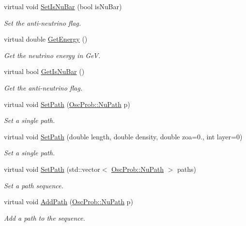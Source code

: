 \begin{DoxyCompactItemize}
virtual void \hyperlink{classOscProb_1_1PMNS__Base_a717e0348cf762f3961854e332a9b52e0}{Set\+Is\+Nu\+Bar} (bool is\+Nu\+Bar)
\begin{DoxyCompactList}\small\item\em Set the anti-\/neutrino flag. \end{DoxyCompactList}\item 
virtual double \hyperlink{classOscProb_1_1PMNS__Base_acc0d46cc4b8f911b40b807225003bbed}{Get\+Energy} ()
\begin{DoxyCompactList}\small\item\em Get the neutrino energy in GeV. \end{DoxyCompactList}\item 
virtual bool \hyperlink{classOscProb_1_1PMNS__Base_a2f7f2a028dfe7a90fff6b4f757972c2c}{Get\+Is\+Nu\+Bar} ()
\begin{DoxyCompactList}\small\item\em Get the anti-\/neutrino flag. \end{DoxyCompactList}\item 
virtual void \hyperlink{classOscProb_1_1PMNS__Base_ac3b644fd0a56347d304ceca4ae9d8875}{Set\+Path} (\hyperlink{structOscProb_1_1NuPath}{Osc\+Prob\+::\+Nu\+Path} p)
\begin{DoxyCompactList}\small\item\em Set a single path. \end{DoxyCompactList}\item 
virtual void \hyperlink{classOscProb_1_1PMNS__Base_a35b983270613072a3df58b574d80dbfd}{Set\+Path} (double length, double density, double zoa=0., int layer=0)
\begin{DoxyCompactList}\small\item\em Set a single path. \end{DoxyCompactList}\item 
virtual void \hyperlink{classOscProb_1_1PMNS__Base_a637d19dd850b4246507796526622643c}{Set\+Path} (std\+::vector$<$ \hyperlink{structOscProb_1_1NuPath}{Osc\+Prob\+::\+Nu\+Path} $>$ paths)
\begin{DoxyCompactList}\small\item\em Set a path sequence. \end{DoxyCompactList}\item 
virtual void \hyperlink{classOscProb_1_1PMNS__Base_a887dc9d4dc569ec0cdef3933b4c60efc}{Add\+Path} (\hyperlink{structOscProb_1_1NuPath}{Osc\+Prob\+::\+Nu\+Path} p)
\begin{DoxyCompactList}\small\item\em Add a path to the sequence. \end{DoxyCompactList}\item 

\end{DoxyCompactItemize}
